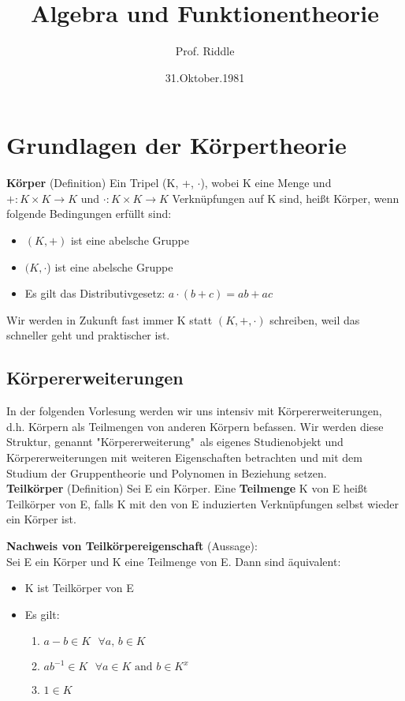 \documentclass[a4paper, 10pt]{scrartcl}
\title {Algebra und Funktionentheorie \\[1ex] \large}
\author{Prof. Riddle}
\date{31.Oktober.1981}
\begin{document}
\maketitle
\tableofcontents
\section{Grundlagen der Körpertheorie}
\textbf{Körper} (Definition)
Ein Tripel (K, +, $\cdot$), wobei K eine Menge und $+: K \times K \rightarrow K $ und $\cdot: K \times K \rightarrow K$ Verknüpfungen auf K sind, heißt Körper, wenn folgende Bedingungen erfüllt sind:
\begin{itemize}
\item $(K,+)$ ist eine abelsche Gruppe
\item $(K, \cdot$) ist eine abelsche Gruppe
\item Es gilt das Distributivgesetz: $a \cdot (b+c) = ab + ac$
\end{itemize}
Wir werden in Zukunft fast immer K statt $(K, +, \cdot)$ schreiben, weil das schneller geht und praktischer ist.
\\

\subsection{Körpererweiterungen}
In der folgenden Vorlesung werden wir uns intensiv mit Körpererweiterungen, d.h. Körpern als Teilmengen von anderen Körpern befassen. Wir werden diese Struktur, genannt "Körpererweiterung"\ als eigenes Studienobjekt und Körpererweiterungen mit weiteren Eigenschaften betrachten und mit dem Studium der Gruppentheorie und Polynomen in Beziehung setzen.
\\

\textbf{Teilkörper} (Definition)
Sei E ein Körper. Eine \textbf{Teilmenge} K von E heißt Teilkörper von E, falls K mit den von E induzierten Verknüpfungen selbst wieder ein Körper ist.

\textbf{Nachweis von Teilkörpereigenschaft} (Aussage): \\
Sei E ein Körper und K eine Teilmenge von E. Dann sind äquivalent:
\begin{itemize}
\item K ist Teilkörper von E
\item Es gilt: \begin{enumerate}[label=\roman*)]
\item $a-b \in K \text{ } \forall a \text{, }b \in K$
\item $ab^{-1} \in K \text{ } \forall a \in K \text{ and } b \in K^{x}$
\item $1 \in K$
\end{enumerate}
\end{itemize}
\end{document}
